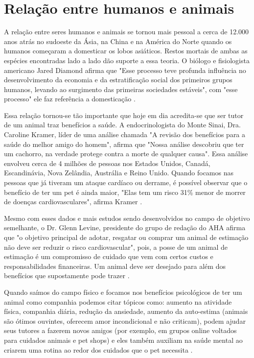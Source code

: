 \section{Relação entre humanos e animais}

A relação entre seres humanos e animais se tornou mais pessoal a cerca de 12.000 anos atrás no sudoeste da Ásia, na China e na América do Norte quando os humanos começaram a domesticar os lobos asiáticos. Restos mortais de ambas as espécies encontradas lado a lado dão suporte a essa teoria. O biólogo e fisiologista americano Jared Diamond afirma que "Esse processo teve profunda influência no desenvolvimento da economia e da estratificação social dos primeiros grupos humanos, levando ao surgimento das primeiras sociedades estáveis", com "esse processo" ele faz referência a domesticação \cite{lobos}.

Essa relação tornou-se tão importante que hoje em dia acredita-se que ser tutor de um animal traz benefícios a saúde. A endocrinologista do Monte Sinai, Dra. Caroline Kramer, líder de uma análise chamada "A revisão dos benefícios para a saúde do melhor amigo do homem", afirma que "Nossa análise descobriu que ter um cachorro, na verdade protege contra a morte de qualquer causa". Essa análise envolveu cerca de 4 milhões de pessoas nos Estados Unidos, Canadá, Escandinávia, Nova Zelândia, Austrália e Reino Unido. Quando focamos nas pessoas que já tiveram um ataque cardíaco ou derrame, é possível observar que o benefício de ter um pet é ainda maior, "Elas tem um risco 31\% menor de morrer de doenças cardiovasculares", afirma Kramer \cite{cardio}.

Mesmo com esses dados e mais estudos sendo desenvolvidos no campo de objetivo semelhante, o  Dr. Glenn Levine, presidente do grupo de redação do \ac{AHA} afirma que "o objetivo principal de adotar, resgatar ou comprar um animal de estimação não deve ser reduzir o risco cardiovascular", pois, a posse de um animal de estimação é um compromisso de cuidado que vem com certos custos e responsabilidades financeiras. Um animal deve ser desejado para além dos benefícios que supostamente pode trazer \cite{aha}.

Quando saímos do campo físico e focamos nos benefícios psicológicos de ter um animal como companhia podemos citar tópicos como: aumento na atividade física, companhia diária, redução da ansiedade, aumento da auto-estima (animais são ótimos ouvintes, oferecem amor incondicional e não criticam), podem ajudar seus tutores a fazerem novos amigos (por exemplo, em grupos online voltados para cuidados animais e pet shops) e eles também auxiliam na saúde mental ao criarem uma rotina ao redor dos cuidados que o pet necessita \cite{mental}.

